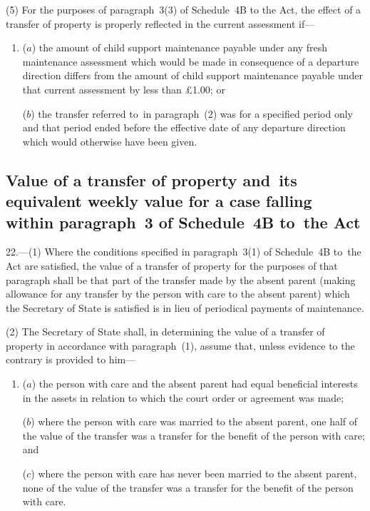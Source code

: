 \documentclass[12pt,a4paper]{article}
\begin{document}
(5) For the purposes of paragraph~3(3) of Schedule~4B to the Act, the effect of
a transfer of property is properly reflected in the current assessment if—%
\begin{enumerate}\item[]
($a$) the amount of child support maintenance payable under any fresh maintenance
assessment which would be made in consequence of a departure direction differs
from the amount of child support maintenance payable under that current
assessment by less than £1$.$00; or

($b$) the transfer referred to~in paragraph~(2) was for a specified period only and
that period ended before the effective date of any departure direction which
would otherwise have been given.
\end{enumerate}

\subsection[22. Value of a transfer of property and~its equivalent weekly value for a case
falling within paragraph~3 of Schedule~4B to~the Act]{Value of a transfer of property and~its equivalent weekly value for a case
falling within paragraph~3 of Schedule~4B to~the Act}

22.—(1) Where the conditions specified in paragraph~3(1) of Schedule~4B to~the Act are satisfied, the value of a transfer of property for the purposes of that paragraph shall be that part of the transfer made by the absent parent (making allowance for any transfer by the person with care to the absent parent) which the Secretary of State is satisfied is in lieu of 
periodical payments of  %
maintenance.%

(2) The Secretary of State shall, in determining the value of a transfer of
property in accordance with paragraph~(1), assume that, unless evidence to the
contrary is provided to him—
\begin{enumerate}\item[]
($a$) the person with care and the absent parent had equal beneficial interests in
the assets in relation to which the court order or agreement was made;

($b$) where the person with care was married to the absent parent, one half of the
value of the transfer was a transfer for the benefit of the person with care;
and

($c$) where the person with care has never been married to the absent parent, none
of the value of the transfer was a transfer for the benefit of the person with
care.
\end{enumerate}
\end{document}
